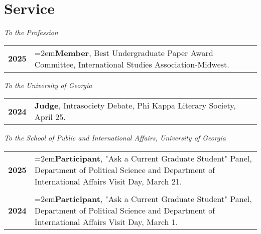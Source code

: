 \documentclass[letterpaper,12pt]{article}
\begin{document}
\section{Service}
\textit{To the Profession}
\begin{xltabular}{\dimexpr\textwidth-0in}{p{.85in}X}
\textbf{2025} &  \hangindent=2em\textbf{Member}, Best Undergraduate Paper Award Committee, International Studies Association-Midwest.
\end{xltabular}
\par
\textit{To the University of Georgia}
\begin{xltabular}{\dimexpr\textwidth-0in}{p{.85in}X}
\textbf{2024} &  \textbf{Judge}, Intrasociety Debate, Phi Kappa Literary Society, April 25.
\end{xltabular}
\par
\textit{To the School of Public and International Affairs, University of Georgia}
\begin{xltabular}{\dimexpr\textwidth-0in}{p{.85in}X}
\textbf{2025} &  \hangindent=2em\textbf{Participant}, "Ask a Current Graduate Student" Panel, Department of Political Science and \mbox{Department} of International Affairs Visit Day, March 21. \\ \\
\textbf{2024} &  \hangindent=2em\textbf{Participant}, "Ask a Current Graduate Student" Panel, Department of Political Science and \mbox{Department} of International Affairs Visit Day, March 1.
\end{xltabular}
\end{document}
